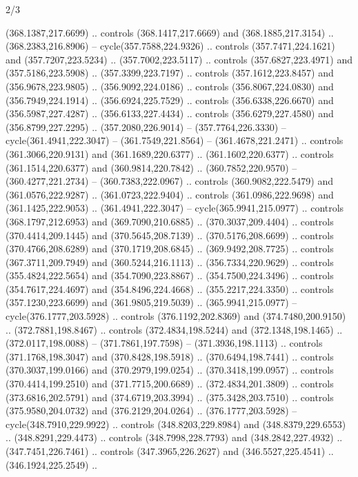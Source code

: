 \begin{flagdescription}{2/3}
\begin{scope}[xshift=0.5\flaglength,yshift=0.5\flagwidth,scale=\flagwidth/495.65]
\begin{scope}[y=0.8pt, x=0.8pt, yscale=-1,shift={(-463.76,-309.78)}]
  (368.1387,217.6699) .. controls (368.1417,217.6669) and (368.1885,217.3154) ..
  (368.2383,216.8906) -- cycle(357.7588,224.9326) .. controls
  (357.7471,224.1621) and (357.7207,223.5234) .. (357.7002,223.5117) .. controls
  (357.6827,223.4971) and (357.5186,223.5908) .. (357.3399,223.7197) .. controls
  (357.1612,223.8457) and (356.9678,223.9805) .. (356.9092,224.0186) .. controls
  (356.8067,224.0830) and (356.7949,224.1914) .. (356.6924,225.7529) .. controls
  (356.6338,226.6670) and (356.5987,227.4287) .. (356.6133,227.4434) .. controls
  (356.6279,227.4580) and (356.8799,227.2295) .. (357.2080,226.9014) --
  (357.7764,226.3330) -- cycle(361.4941,222.3047) -- (361.7549,221.8564) --
  (361.4678,221.2471) .. controls (361.3066,220.9131) and (361.1689,220.6377) ..
  (361.1602,220.6377) .. controls (361.1514,220.6377) and (360.9814,220.7842) ..
  (360.7852,220.9570) -- (360.4277,221.2734) -- (360.7383,222.0967) .. controls
  (360.9082,222.5479) and (361.0576,222.9287) .. (361.0723,222.9404) .. controls
  (361.0986,222.9698) and (361.1425,222.9053) .. (361.4941,222.3047) --
  cycle(365.9941,215.0977) .. controls (368.1797,212.6953) and
  (369.7090,210.6885) .. (370.3037,209.4404) .. controls (370.4414,209.1445) and
  (370.5645,208.7139) .. (370.5176,208.6699) .. controls (370.4766,208.6289) and
  (370.1719,208.6845) .. (369.9492,208.7725) .. controls (367.3711,209.7949) and
  (360.5244,216.1113) .. (356.7334,220.9629) .. controls (355.4824,222.5654) and
  (354.7090,223.8867) .. (354.7500,224.3496) .. controls (354.7617,224.4697) and
  (354.8496,224.4668) .. (355.2217,224.3350) .. controls (357.1230,223.6699) and
  (361.9805,219.5039) .. (365.9941,215.0977) -- cycle(376.1777,203.5928) ..
  controls (376.1192,202.8369) and (374.7480,200.9150) .. (372.7881,198.8467) ..
  controls (372.4834,198.5244) and (372.1348,198.1465) .. (372.0117,198.0088) --
  (371.7861,197.7598) -- (371.3936,198.1113) .. controls (371.1768,198.3047) and
  (370.8428,198.5918) .. (370.6494,198.7441) .. controls (370.3037,199.0166) and
  (370.2979,199.0254) .. (370.3418,199.0957) .. controls (370.4414,199.2510) and
  (371.7715,200.6689) .. (372.4834,201.3809) .. controls (373.6816,202.5791) and
  (374.6719,203.3994) .. (375.3428,203.7510) .. controls (375.9580,204.0732) and
  (376.2129,204.0264) .. (376.1777,203.5928) -- cycle(348.7910,229.9922) ..
  controls (348.8203,229.8984) and (348.8379,229.6553) .. (348.8291,229.4473) ..
  controls (348.7998,228.7793) and (348.2842,227.4932) .. (347.7451,226.7461) ..
  controls (347.3965,226.2627) and (346.5527,225.4541) .. (346.1924,225.2549) ..

\end{scope}
\end{scope}
\end{flagdescription}
